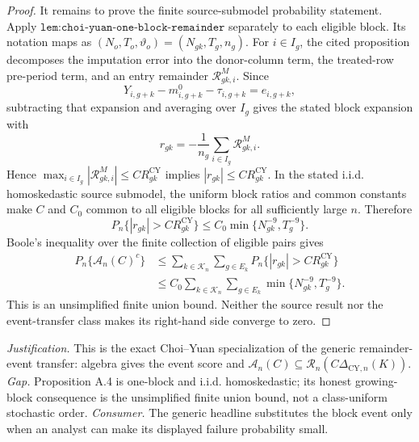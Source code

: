\documentclass{article}
\begin{document}
\begin{proof}
It remains to prove the finite source-submodel probability statement.
Apply \(\texttt{lem:choi-yuan-one-block-remainder}\) separately to each
eligible block.  Its notation maps as
\((N_o,T_o,\vartheta_o)=(N_{gk},T_g,n_g)\).  For \(i\in I_g\), the cited
proposition decomposes the imputation error into the donor-column term,
the treated-row pre-period term, and an entry remainder
\(\mathcal R^M_{gk,i}\).  Since
\[
 Y_{i,g+k}-m^0_{i,g+k}-\tau_{i,g+k}=e_{i,g+k},
\]
subtracting that expansion and averaging over \(I_g\) gives the stated
block expansion with
\[
 r_{gk}=-\frac1{n_g}\sum_{i\in I_g}\mathcal R^M_{gk,i}.
\]
Hence
\(\max_{i\in I_g}|\mathcal R^M_{gk,i}|\le
C R_{gk}^{\mathrm{CY}}\) implies
\(|r_{gk}|\le C R_{gk}^{\mathrm{CY}}\).  In the stated i.i.d.
homoskedastic source submodel, the uniform block ratios and common
constants make \(C\) and \(C_0\) common to all eligible blocks for all
sufficiently large \(n\).  Therefore
\[
 P_n\{|r_{gk}|>C R_{gk}^{\mathrm{CY}}\}
 \le C_0\min\{N_{gk}^{-9},T_g^{-9}\}.
\]
Boole's inequality over the finite collection of eligible pairs gives
\[
 \begin{aligned}
 P_n\{\mathcal A_n(C)^c\}
 &\le\sum_{k\in\mathcal K_n}\sum_{g\in E_k}
 P_n\{|r_{gk}|>C R_{gk}^{\mathrm{CY}}\}\\
 &\le C_0\sum_{k\in\mathcal K_n}\sum_{g\in E_k}
 \min\{N_{gk}^{-9},T_g^{-9}\}.
 \end{aligned}
\]
This is an unsimplified finite union bound.  Neither the source result nor
the event-transfer class makes its right-hand side converge to zero.
\end{proof}
\par\smallskip\noindent \textit{Justification.} This is the exact Choi--Yuan specialization of the generic remainder-event transfer: algebra gives the event score and \(\mathcal A_n(C)\subseteq\mathcal R_n(C\Delta_{\mathrm{CY},n}(K))\). \textit{Gap.} Proposition A.4 is one-block and i.i.d. homoskedastic; its honest growing-block consequence is the unsimplified finite union bound, not a class-uniform stochastic order. \textit{Consumer.} The generic headline substitutes the block event only when an analyst can make its displayed failure probability small.
\end{document}
